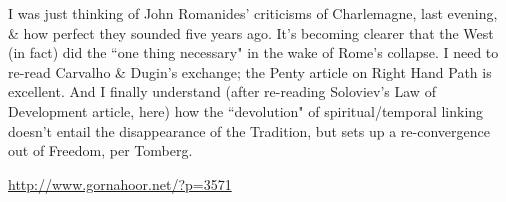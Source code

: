 \begin{footnotesize}
\begin{sffamily}
I was just thinking of John Romanides' criticisms of Charlemagne, last evening, \& how perfect they sounded five years ago. It's becoming clearer that the West (in fact) did the ``one thing necessary" in the wake of Rome's collapse. I need to re-read Carvalho \& Dugin's exchange; the Penty article on Right Hand Path is excellent. And I finally understand (after re-reading Soloviev's Law of Development article, here) how the ``devolution" of spiritual/temporal linking doesn't entail the disappearance of the Tradition, but sets up a re-convergence out of Freedom, per Tomberg.

\url{http://www.gornahoor.net/?p=3571}


\end{sffamily}\end{footnotesize}
